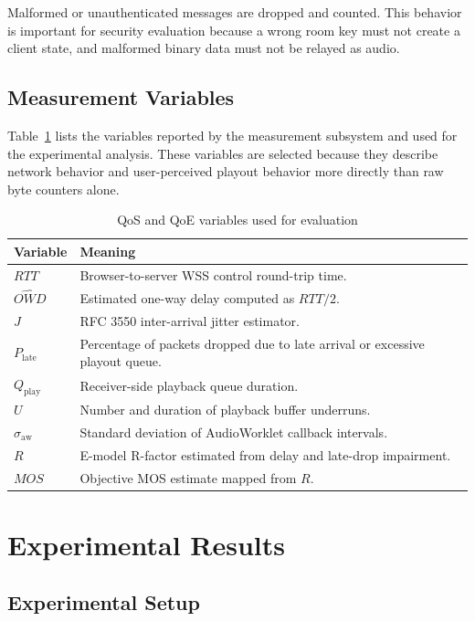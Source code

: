 \documentclass[conference]{IEEEtran}
\begin{document}
Malformed or unauthenticated messages are dropped and counted. This behavior is important for security evaluation because a wrong room key must not create a client state, and malformed binary data must not be relayed as audio.

\subsection{Measurement Variables}

Table~\ref{tab:variables} lists the variables reported by the measurement subsystem and used for the experimental analysis. These variables are selected because they describe network behavior and user-perceived playout behavior more directly than raw byte counters alone.

\begin{table}[H]
\centering
\caption{QoS and QoE variables used for evaluation}
\label{tab:variables}
\renewcommand{\arraystretch}{1.15}
\begin{tabularx}{\columnwidth}{lX}
\toprule
\textbf{Variable} & \textbf{Meaning} \\
\midrule
$RTT$ & Browser-to-server WSS control round-trip time. \\
$\widehat{OWD}$ & Estimated one-way delay computed as $RTT/2$. \\
$J$ & RFC 3550 inter-arrival jitter estimator. \\
$P_{\mathrm{late}}$ & Percentage of packets dropped due to late arrival or excessive playout queue. \\
$Q_{\mathrm{play}}$ & Receiver-side playback queue duration. \\
$U$ & Number and duration of playback buffer underruns. \\
$\sigma_{\mathrm{aw}}$ & Standard deviation of AudioWorklet callback intervals. \\
$R$ & E-model R-factor estimated from delay and late-drop impairment. \\
$MOS$ & Objective MOS estimate mapped from $R$. \\
\bottomrule
\end{tabularx}
\end{table}

\section{Experimental Results}

\subsection{Experimental Setup}
\end{document}
